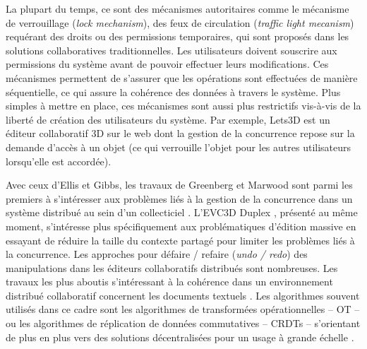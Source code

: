 La plupart du temps, ce sont des mécanismes autoritaires comme le mécanisme 
de verrouillage (\textit{lock mechanism}), des feux de circulation (\textit{traffic 
light mecanism}) requérant des droits ou des permissions temporaires, qui sont 
proposés dans les solutions collaboratives traditionnelles. Les utilisateurs doivent 
souscrire aux permissions du système avant de pouvoir effectuer leurs 
modifications. Ces mécanismes permettent de s'assurer que les opérations sont 
effectuées de manière séquentielle, ce qui assure la cohérence des données à 
travers le système. Plus simples à mettre en place, ces mécanismes sont aussi plus 
restrictifs vis-à-vis de la liberté de création des utilisateurs du système. Par 
exemple, Lets3D \cite{Ha2015} est un éditeur collaboratif \gls{3D} sur le web dont 
la gestion de la concurrence repose sur la demande d'accès à un objet 
(ce qui verrouille l'objet pour les autres utilisateurs lorsqu'elle est 
accordée).

 Avec ceux d'Ellis et Gibbs, les travaux de Greenberg et Marwood sont parmi les 
premiers à s'intéresser aux problèmes liés à la gestion de la concurrence dans 
un système distribué au sein d'un collecticiel \cite{Ellis1989,Greenberg1994}. 
L'\gls{EVC3D} Duplex \cite{Pacull1994}, présenté au même 
moment, s'intéresse plus spécifiquement aux problématiques d'édition massive
en essayant de réduire la taille du contexte partagé pour 
limiter les problèmes liés à la concurrence. 
Les approches pour défaire / refaire (\textit{undo / redo}) des manipulations dans 
les éditeurs collaboratifs distribués sont nombreuses. Les travaux les plus 
aboutis s'intéressant à la cohérence dans un environnement distribué 
collaboratif concernent les documents textuels \cite{Prakash1994,Ressel1996,Sun2002}. 
Les algorithmes souvent utilisés dans ce cadre sont les algorithmes 
de  transformées opérationnelles -- \gls{OT} -- \cite{Ellis1989} ou les algorithmes 
de réplication de  données commutatives -- \glspl{CRDT} -- \cite{Shapiro2007} 
s'orientant de plus en plus vers des solutions décentralisées pour un usage à 
grande échelle \cite{Weiss2009a}. 

